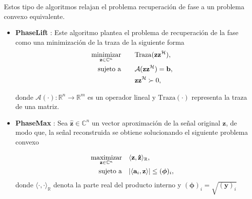 Estos tipo de algoritmos relajan el problema recuperación de fase a un problema convexo equivalente.

\begin{itemize}
    \item \textbf{PhaseLift }:
    Este algoritmo plantea el problema de recuperación de la fase como una minimización de la traza de la siguiente forma
    \begin{equation}
        \begin{aligned}
            \operatorname*{minimizar}_{\mathbf{z} \in \mathbb{C}^{n}} \quad & \quad \mathrm{Traza}(\mathbf{z}\mathbf{z}^{\mathcal{H}}), \\
            \operatorname*{sujeto \ a} \quad & \quad \mathcal{A}(\mathbf{z}\mathbf{z}^{\mathcal{H}}) = \mathbf{b}, \\
             &\quad  \mathbf{z}\mathbf{z}^{\mathcal{H}} \succ 0,
        \end{aligned}
    \end{equation}
    
    donde $\mathcal{A}( \cdot ): \mathbb{R}^{n} \rightarrow \mathbb{R}^{m}$ es un operador lineal y $\mathrm{Traza}(\cdot)$ representa la traza de una matriz.
    
    \item \textbf{PhaseMax} :
    Sea $\mathbf{\hat{z}} \in \mathbb{C}^{n}$ un vector aproximación de la señal original $\mathbf{z}$, de modo que, la señal reconstruida se obtiene solucionando el siguiente problema convexo
        
    \begin{equation}
        \begin{aligned}
            \operatorname*{maximizar}_{\mathbf{z}\in \mathbb{C}^n} \quad & \langle \mathbf{z}, \mathbf{\hat{z}} \rangle_{\mathbb{R}}, \\
            \operatorname*{sujeto \ a} \quad & \vert \langle \mathbf{a}_i,\mathbf{z} \rangle \vert \leq (\boldsymbol{\phi})_i,
        \end{aligned}
    \end{equation}
    donde $\langle \cdot, \cdot \rangle_{\mathbb{R}}$ denota la parte real del producto interno y $(\boldsymbol{\phi})_i = \sqrt{(\mathbf{y})_i}$
    
\end{itemize}

